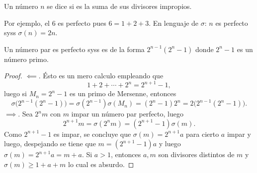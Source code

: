 \documentclass[teoria-numeros.tex]{subfiles}
\begin{document}
\begin{mydef}
	Un número $n$ se dice  si es la suma de sus divisores impropios.
\end{mydef}
Por ejemplo, el 6 es perfecto pues $6 = 1 + 2 + 3$.
En lenguaje de $\sigma$: $n$ es perfecto syss $\sigma(n) = 2n$.

\begin{thm}
	Un número par es perfecto syss es de la forma $2^{n-1}(2^n - 1)$ donde $2^n - 1$ es un número primo.
\end{thm}
\begin{proof}
	$\impliedby$. Ésto es un mero calculo empleando que
	$$ 1 + 2 + \cdots + 2^n = 2^{n+1} - 1, $$
	luego si $M_n = 2^n - 1$ es un primo de Mersenne, entonces
	$$ \sigma\big( 2^{n-1}(2^n - 1) \big) = \sigma(2^{n-1}) \sigma(M_n) = (2^n - 1) 2^n = 2\big( 2^{n-1}(2^n - 1) \big). $$
	$\implies$. Sea $2^n m$ con $m$ impar un número par perfecto, luego
	$$ 2^{n+1} m = \sigma(2^n m) = (2^{n+1} - 1) \sigma(m). $$
	Como $2^{n+1} - 1$ es impar, se concluye que $\sigma(m) = 2^{n+1} a$ para cierto $a$ impar y luego, despejando se tiene que $m = (2^{n+1} - 1)a$
	y luego $\sigma(m) = 2^{n+1}a = m + a$.
	Si $a > 1$, entonces $a, m$ son divisores distintos de $m$ y $\sigma(m) \ge 1 + a + m$ lo cual es absurdo.
\end{proof}
\end{document}
